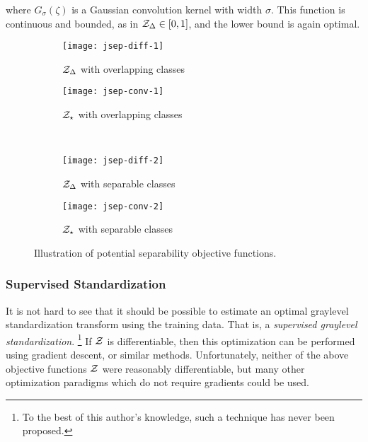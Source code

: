 where $G_{\sigma}(\zeta)$ is a Gaussian convolution kernel with width $\sigma$.
This function is continuous and bounded, as in $\mathcal{Z}_{\Delta}\in\left[0,1\right]$, and the lower bound is again optimal.
\par
\begin{figure}
  \centering
  \begin{subfigure}{\plotwidth}\texttt{[image: jsep-diff-1]}\caption{$\mathcal{Z}_{\Delta}$ with overlapping classes}\label{fig:jsep-diff-1}\end{subfigure}
  \begin{subfigure}{\plotwidth}\texttt{[image: jsep-conv-1]}\caption{$\mathcal{Z}_{\star}$ with overlapping classes}\label{fig:jsep-conv-1}\end{subfigure}\\[1em]
  \begin{subfigure}{\plotwidth}\texttt{[image: jsep-diff-2]}\caption{$\mathcal{Z}_{\Delta}$ with separable classes}\label{fig:jsep-diff-2}\end{subfigure}
  \begin{subfigure}{\plotwidth}\texttt{[image: jsep-conv-2]}\caption{$\mathcal{Z}_{\star}$ with separable classes}\label{fig:jsep-conv-2}\end{subfigure}
  \caption{Illustration of potential separability objective functions.}
  \label{fig:jsep}
\end{figure}
\subsubsection{Supervised Standardization}
It is not hard to see that it should be possible to estimate an optimal graylevel standardization transform using the training data.
That is, a \textit{supervised graylevel standardization}.%
\footnote{To the best of this author's knowledge, such a technique has never been proposed.}
If $\mathcal{Z}$ is differentiable, then this optimization can be performed using gradient descent, or similar methods.
Unfortunately, neither of the above objective functions $\mathcal{Z}$ were reasonably differentiable, but many other optimization paradigms which do not require gradients could be used.
